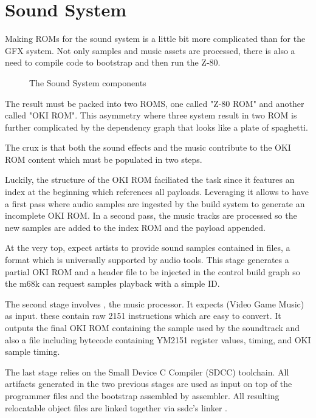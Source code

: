 \chapter{Sound System}
Making ROMs for the sound system is a little bit more complicated than for the GFX system. Not only samples and music assets are processed, there is also a need to compile code to bootstrap and then run the Z-80. 

\begin{figure}[H]
\caption*{The Sound System components}
\end{figure}

The result must be packed into two ROMS, one called "Z-80 ROM" and another called "OKI ROM". This asymmetry where three system result in two ROM is further complicated by the dependency graph that looks like a plate of spaghetti. 

The crux is that both the sound effects and the music contribute to the OKI ROM content which must be populated in two steps.




Luckily, the structure of the OKI ROM faciliated the task since it features an index at the beginning which references all payloads. Leveraging it allows to have a first pass where audio samples are ingested by the build system to generate an incomplete OKI ROM. In a second pass, the music tracks are processed so the new samples are added to the index ROM and the payload appended.

At the very top,  expect artists to provide sound samples contained in  files, a format which is universally supported by audio tools. This stage generates a partial OKI ROM and a  header file to be injected in the control build graph so the m68k can request samples playback with a simple ID.

The second stage involves , the music processor. It expects  (Video Game Music) as input. these contain raw 2151 instructions which are easy to convert. It outputs the final OKI ROM containing the sample used by the soundtrack and also a  file including bytecode containing YM2151 register values, timing, and OKI sample timing.

The last stage relies on the Small Device C Compiler (SDCC) toolchain. All artifacts generated in the two previous stages are used as input on top of the programmer  files and the bootstrap  assembled by  assembler. All resulting relocatable object files  are linked together via ssdc's linker . 


